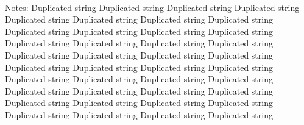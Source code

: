 \documentclass{article}
\begin{document}
\begin{landscape}
\begin{table}[tbp]
{\begin{tabularx}{\linewidth}{@{}lCCCCCCCCCCC@{}}
\end{tabularx}
\\ \parbox{\linewidth}{\footnotesize Notes: Duplicated string Duplicated string Duplicated string Duplicated string Duplicated string Duplicated string Duplicated string Duplicated string Duplicated string Duplicated string Duplicated string Duplicated string Duplicated string Duplicated string Duplicated string Duplicated string Duplicated string Duplicated string Duplicated string Duplicated string Duplicated string Duplicated string Duplicated string Duplicated string Duplicated string Duplicated string Duplicated string Duplicated string Duplicated string Duplicated string Duplicated string Duplicated string Duplicated string Duplicated string Duplicated string Duplicated string Duplicated string Duplicated string Duplicated string Duplicated string }
}
\end{table}
\restoregeometry
\end{landscape}
\end{document}
